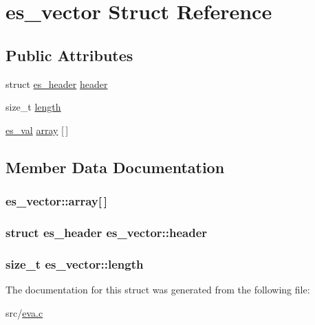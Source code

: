 \hypertarget{structes__vector}{\section{es\-\_\-vector Struct Reference}
\label{structes__vector}
}
\subsection*{Public Attributes}
\begin{DoxyCompactItemize}
\item 
struct \hyperlink{structes__header}{es\-\_\-header} \hyperlink{structes__vector_a4354428ef07976147676806f3cbeb930}{header}
\item 
size\-\_\-t \hyperlink{structes__vector_a30c8e526ef84642e7b1ff2676335f69c}{length}
\item 
\hyperlink{eva_8h_a8333c63b2093a13aab6d419c87680d7f}{es\-\_\-val} \hyperlink{structes__vector_a731f63e725bdc58c9121a3d87982ecfe}{array} \mbox{[}$\,$\mbox{]}
\end{DoxyCompactItemize}


\subsection{Member Data Documentation}
\hypertarget{structes__vector_a731f63e725bdc58c9121a3d87982ecfe}{
\subsubsection[{array}]{ es\-\_\-vector\-::array\mbox{[}$\,$\mbox{]}}}\label{structes__vector_a731f63e725bdc58c9121a3d87982ecfe}
\hypertarget{structes__vector_a4354428ef07976147676806f3cbeb930}{
\subsubsection[{header}]{\setlength{\rightskip}{0pt plus 5cm}struct {\bf es\-\_\-header} es\-\_\-vector\-::header}}\label{structes__vector_a4354428ef07976147676806f3cbeb930}
\hypertarget{structes__vector_a30c8e526ef84642e7b1ff2676335f69c}{
\subsubsection[{length}]{\setlength{\rightskip}{0pt plus 5cm}size\-\_\-t es\-\_\-vector\-::length}}\label{structes__vector_a30c8e526ef84642e7b1ff2676335f69c}


The documentation for this struct was generated from the following file\-:\begin{DoxyCompactItemize}
\item 
src/\hyperlink{eva_8c}{eva.\-c}\end{DoxyCompactItemize}
